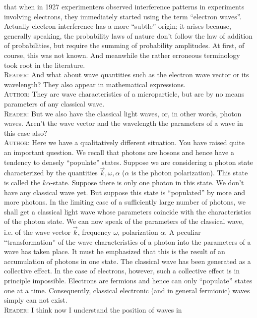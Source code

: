 \documentclass[a4paper,sfsidenotes,colorlinks=true]{tufte-book}
\numberwithin{equation}{section}
\numberwithin{figure}{section}
\begin{document}
that when in 1927 experimenters observed interference patterns in
experiments involving electrons, they immediately started using the
term ``electron waves''. Actually electron interference has a more
``subtle'' origin; it arises because, generally speaking, the
probability laws of nature don't follow the law of addition of
probabilities, but require the summing of probability amplitudes. At
first, of course, this was not known. And meanwhile the rather
erroneous terminology took root in the literature.
\\
\textsc{Reader}: And what about wave quantities such as the electron
wave vector or its wavelength? They also appear in mathematical
expressions.
\\
\textsc{Author}: They are wave characteristics of a microparticle, but
are by no means parameters of any classical wave.
\\
\textsc{Reader}: But we also have the classical light waves, or, in
other words, photon waves. Aren't the wave vector and the wavelength
the parameters of a wave in this case also?
\\
\textsc{Author}: Here we have a qualitatively different situation. You
have raised quite an important question. We recall that photons are
hosons and hence have a tendency to densely ``populate''
states. Suppose we are considering a photon state characterized by the
quantities $\vec{k}, \omega, \alpha $ ($\alpha$ is the photon
polarization). This state is called the $k \alpha$-state.  Suppose
there is only one photon in this state. We don't have any classical
wave yet. But suppose this state is ``populated'' by more and more
photons. In the limiting case of a sufficiently large number of
photons, we shall get a classical light wave whose parameters coincide
with the characteristics of the photon state. We can now speak of the
parameters of the classical wave, i.e. of the wave vector $\vec{k}$,
frequency $\omega$, polarization $\alpha$. A peculiar
``transformation'' of the wave characteristics of a photon into the
parameters of a wave has taken place. It must he emphasized that this
is the result of an accumulation of photons in one state. The
classical wave has been generated as a collective effect. In the case
of electrons, however, such a collective effect is in principle
impossible. Electrons are fermions and hence can only ``populate''
states one at a time. Consequently, classical electronic (and in
general fermionic) waves simply can not exist.
\\
\textsc{Reader}: I think now I understand the position of waves in
\end{document}
